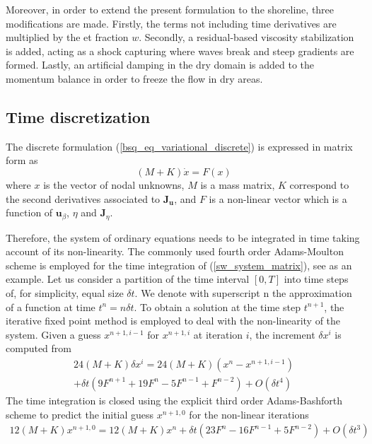 Moreover, in order to extend the present formulation to the shoreline, three modifications are made. Firstly, the terms not including time derivatives are multiplied by the et fraction $w$. Secondly, a residual-based viscosity stabilization is added, acting as a shock capturing where waves break and steep gradients are formed. Lastly, an artificial damping in the dry domain is added to the momentum balance in order to freeze the flow in dry areas.



\subsection{Time discretization}

The discrete formulation (\ref{bsq_eq_variational_discrete}) is expressed in matrix form as
\begin{equation} \label{sw_system_matrix}
    (M + K) \dot{x} = F(x)
\end{equation} 
where $x$ is the vector of nodal unknowns, $M$ is a mass matrix, $K$ correspond to the second derivatives associated to $\mathbf{J}_{\mathbf{u}}$, and $F$ is a non-linear vector which is a function of $\mathbf{u}_\beta$, $\eta$ and $\mathbf{J}_\eta$.

Therefore, the system of ordinary equations needs to be integrated in time taking account of its non-linearity.
The commonly used fourth order Adams-Moulton scheme is employed for the time integration of (\ref{sw_system_matrix}), see \cite{wei1995,woo2004a,codina2008b} as an example.
Let us consider a partition of the time interval $[0, T]$ into time steps of, for simplicity, equal size $\delta t$. We denote with superscript n the approximation of a function at time $t^n = n\delta t$.
To obtain a solution at the time step $t^{n+1}$, the iterative fixed point method is employed to deal with the non-linearity of the system. Given a guess $x^{n+1,i-1}$ for $x^{n+1,i}$ at iteration $i$, the increment $\delta x^i$ is computed from
\begin{multline}
    24 (M + K) \delta x^i = 
    24 (M + K) (x^n - x^{n+1,i-1}) \\
     + \delta t (9F^{n+1} + 19F^n - 5F^{n-1} + F^{n-2}) + O(\delta t^4)
    \label{adams-moulton}
\end{multline}
The time integration is closed using the explicit third order Adams-Bashforth scheme to predict the initial guess $x^{n+1,0}$ for the non-linear iterations
\begin{multline}
    12 (M + K) x^{n+1,0} = 
    12 (M + K) x^n 
     + \delta t (23F^n - 16F^{n-1} + 5F^{n-2}) + O(\delta t^3)
    \label{adams-bashforth}
\end{multline}

